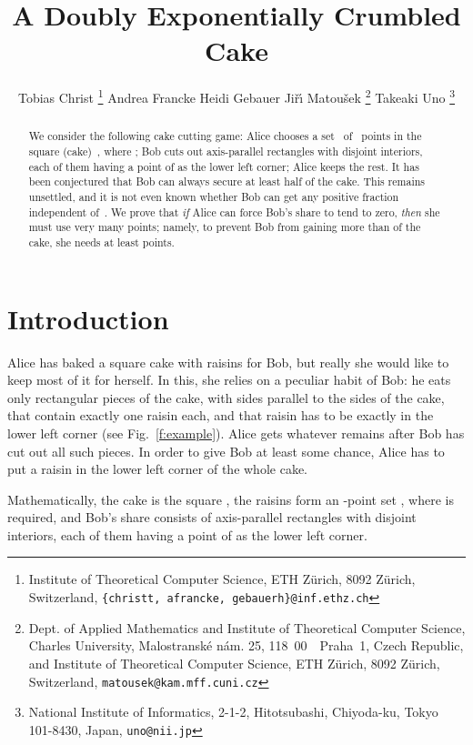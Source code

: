 \documentclass[11pt]{article}
\begin{document}
\title
{A Doubly Exponentially Crumbled Cake}

\author{
{Tobias Christ \footnote{Institute of Theoretical Computer Science, ETH Z\"urich, 8092 Z\"urich, Switzerland, {\texttt{\{christt, afrancke, gebauerh\}@inf.ethz.ch}} } }\quad
{Andrea Francke } \quad
{Heidi Gebauer } \quad
{Ji\v{r}\'{\i} Matou\v{s}ek \footnote{Dept. of Applied Mathematics and Institute of Theoretical Computer Science, Charles University, Malostransk\'{e} n\'{a}m. 25,
118~00~~Praha~1, Czech Republic, and Institute of Theoretical Computer Science, ETH Z\"urich, 8092 Z\"urich, Switzerland, {\texttt{matousek@kam.mff.cuni.cz}}} } \quad
{Takeaki Uno \footnote{National Institute of Informatics, 2-1-2, Hitotsubashi, Chiyoda-ku,
Tokyo 101-8430, Japan, {\texttt{uno@nii.jp}}}}
}

\maketitle
\begin{abstract}
We consider the following cake cutting game: 
Alice chooses a set~ of ~points in
the square (cake)~, where ; 
Bob cuts out  axis-parallel rectangles with disjoint
interiors, each of them having a point of  as the
lower left corner;  Alice keeps the rest.
It has been conjectured that Bob can always secure at least half
of the cake. This remains unsettled, and it is not even known
whether Bob can get any positive fraction independent of~.
 We prove that \emph{if} Alice can force Bob's share
to tend to zero, \emph{then} she must use very many points; namely,
to prevent Bob from gaining more than  of the cake,
she needs at least  points. 
\end{abstract}
\section{Introduction}

Alice has baked a square cake with raisins for Bob, but
really she would like to keep most of it for herself.
In this, she relies on a peculiar habit of Bob: he eats only
rectangular pieces of the cake, with sides parallel
to the sides of the cake, that contain exactly one raisin each,
and that raisin has to be exactly in the lower left corner
(see Fig.~\ref{f:example}). Alice gets whatever remains
after Bob has cut out all such pieces. In order to give
Bob at least some chance, Alice has to put a raisin
in the lower left corner of the whole cake. 

Mathematically, the cake is the square , the raisins
form an -point set , where
 is required, and Bob's share consists of 
 axis-parallel rectangles with disjoint
interiors, each of them having a point of  as the
lower left corner.
\end{document}
